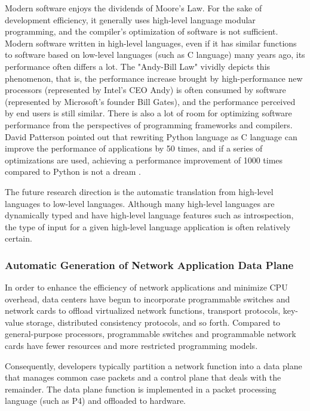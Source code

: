 Modern software enjoys the dividends of Moore's Law. For the sake of development efficiency, it generally uses high-level language modular programming, and the compiler's optimization of software is not sufficient. Modern software written in high-level languages, even if it has similar functions to software based on low-level languages (such as C language) many years ago, its performance often differs a lot. The "Andy-Bill Law" \cite{langchaozhidian} vividly depicts this phenomenon, that is, the performance increase brought by high-performance new processors (represented by Intel's CEO Andy) is often consumed by software (represented by Microsoft's founder Bill Gates), and the performance perceived by end users is still similar. There is also a lot of room for optimizing software performance from the perspectives of programming frameworks and compilers. David Patterson pointed out that rewriting Python language as C language can improve the performance of applications by 50 times, and if a series of optimizations are used, achieving a performance improvement of 1000 times compared to Python is not a dream \cite{python-to-c}.
\fi

The future research direction is the automatic translation from high-level languages to low-level languages. Although many high-level languages are dynamically typed and have high-level language features such as introspection, the type of input for a given high-level language application is often relatively certain.
\fi

\subsubsection{Automatic Generation of Network Application Data Plane}
\label{future:p4coder}

In order to enhance the efficiency of network applications and minimize CPU overhead, data centers have begun to incorporate programmable switches and network cards to offload virtualized network functions, transport protocols, key-value storage, distributed consistency protocols, and so forth. Compared to general-purpose processors, programmable switches and programmable network cards have fewer resources and more restricted programming models. 

Consequently, developers typically partition a network function into a data plane that manages common case packets and a control plane that deals with the remainder. The data plane function is implemented in a packet processing language (such as P4) and offloaded to hardware.

